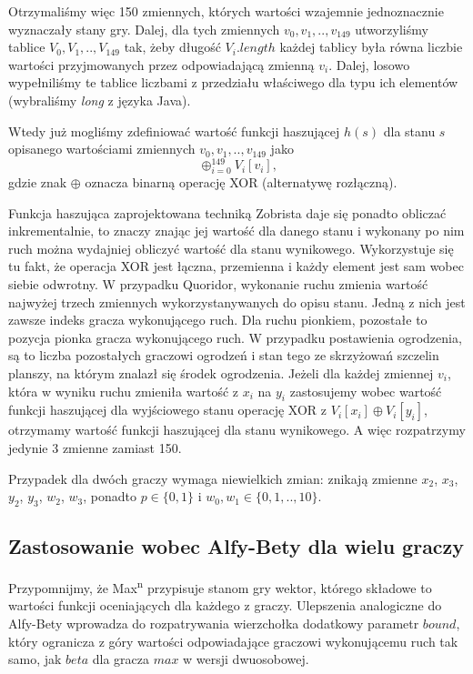 \documentclass{pracamgr}
\begin{document}
Otrzymaliśmy więc 150 zmiennych, których wartości wzajemnie jednoznacznie wyznaczały stany gry.
Dalej, dla tych zmiennych \(v_0, v_1, .., v_{149}\) utworzyliśmy tablice \(V_0, V_1, .., V_{149}\) tak, żeby długość \(V_i.length\) każdej tablicy była równa liczbie wartości przyjmowanych przez odpowiadającą zmienną \(v_i\).
Dalej, losowo wypełniliśmy te tablice liczbami z przedziału właściwego dla typu ich elementów (wybraliśmy \emph{long} z języka Java).

Wtedy już mogliśmy zdefiniować wartość funkcji haszującej \(h(s)\) dla stanu \(s\) opisanego wartościami zmiennych \(v_0, v_1, .., v_{149}\) jako \[\oplus_{i = 0}^{149} V_i[v_i]\text{,}\] gdzie znak \(\oplus\) oznacza binarną operację XOR (alternatywę rozłączną).

Funkcja haszująca zaprojektowana techniką Zobrista daje się ponadto obliczać inkrementalnie, to znaczy znając jej wartość dla danego stanu i wykonany po nim ruch można wydajniej obliczyć wartość dla stanu wynikowego.
Wykorzystuje się tu fakt, że operacja XOR jest łączna, przemienna i każdy element jest sam wobec siebie odwrotny.
W przypadku Quoridor, wykonanie ruchu zmienia wartość najwyżej trzech zmiennych wykorzystanywanych do opisu stanu.
Jedną z nich jest zawsze indeks gracza wykonującego ruch.
Dla ruchu pionkiem, pozostałe to pozycja pionka gracza wykonującego ruch.
W przypadku postawienia ogrodzenia, są to liczba pozostałych graczowi ogrodzeń i stan tego ze skrzyżowań szczelin planszy, na którym znalazł się środek ogrodzenia.
Jeżeli dla każdej zmiennej \(v_i\), która w wyniku ruchu zmieniła wartość z \(x_i\) na \(y_i\) zastosujemy wobec wartość funkcji haszującej dla wyjściowego stanu operację XOR z \(V_i[x_i] \oplus V_i[y_i]\), otrzymamy wartość funkcji haszującej dla stanu wynikowego.
A więc rozpatrzymy jedynie 3 zmienne zamiast 150.

Przypadek dla dwóch graczy wymaga niewielkich zmian: znikają zmienne \(x_2\), \(x_3\), \(y_2\), \(y_3\), \(w_2\), \(w_3\), ponadto \(p \in \{0, 1\}\) i \(w_0, w_1 \in \{0, 1, .., 10\}\).

\subsection{Zastosowanie wobec Alfy-Bety dla wielu graczy}

Przypomnijmy, że Max\textsuperscript{n} przypisuje stanom gry wektor, którego składowe to wartości funkcji oceniających dla każdego z graczy.
Ulepszenia analogiczne do Alfy-Bety wprowadza do rozpatrywania wierzchołka dodatkowy parametr \(bound\), który ogranicza z góry wartości odpowiadające graczowi wykonującemu ruch tak samo, jak \(beta\) dla gracza \(max\) w wersji dwuosobowej.
\end{document}
